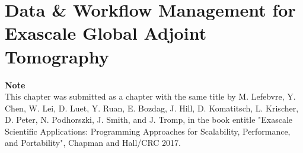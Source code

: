 \chapter[Data \& Workflow Management for Exascale Global Adjoint Tomography]{Data \& Workflow Management for Exascale Global Adjoint Tomography}

\textbf{Note}\\
This chapter was submitted as a chapter with the same title by
M. Lefebvre, Y. Chen, W. Lei, D. Luet, Y. Ruan, E. Bozdag, J. Hill,
D. Komatitsch, L. Krischer, D. Peter, N. Podhorszki, J. Smith, and J. Tromp,
in the book entitle "Exascale Scientific Applications: Programming Approaches
for Scalability, Performance, and Portability",
Chapman and Hall/CRC 2017.












%
